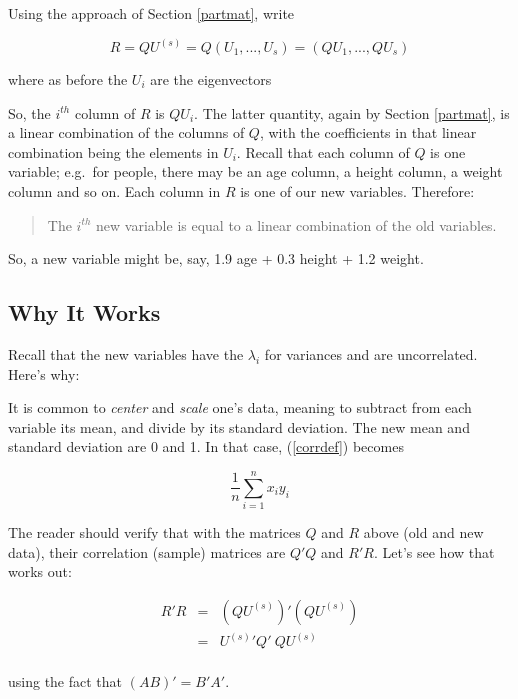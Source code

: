 Using the approach of Section \ref{partmat}, write

\begin{equation}
R = Q U^{(s)} = Q (U_1,...,U_s) = (QU_1,...,QU_s)
\end{equation}

where as before the $U_i$ are the eigenvectors

So, the $i^{th}$ column of $R$ is $Q U_i$.  The latter quantity, again
by Section \ref{partmat}, is a linear combination of the columns of $Q$,
with the coefficients in that linear combination being the elements in
$U_i$.  Recall that each column of $Q$ is one variable; e.g.\ for
people, there may be an age column, a height column, a weight column and
so on.  Each column in $R$ is one of our new variables.  Therefore:

\begin{quote}
The $i^{th}$ new variable is equal to a linear combination of the old
variables.
\end{quote}

So, a new variable might be, say, 1.9 age + 0.3 height + 1.2 weight.

\subsection{Why It Works}

Recall that the new variables have the $\lambda_i$ for variances and are
uncorrelated.  Here's why:

It is common to \textit{center} and \textit{scale} one's data, meaning
to subtract from each variable its mean, and divide by its standard
deviation.  The new mean and standard deviation are 0 and 1.  In that
case, (\ref{corrdef}) becomes


\begin{equation}
\frac{1}{n} \sum_{i=1}^n x_i y_i
\end{equation}

The reader should verify that with the matrices $Q$ and $R$ above (old
and new data), their correlation (sample) matrices are $Q'Q$ and $R'R$.
Let's see how that works out:

\begin{eqnarray}
\label{rrqq}
R'R &=& (Q U^{(s)})' (QU^{(s)}) \\  
&=&  
U^{(s)} {}' Q' ~ Q U^{(s)} \\
\end{eqnarray}

using the fact that $(AB)' = B'A'$.

